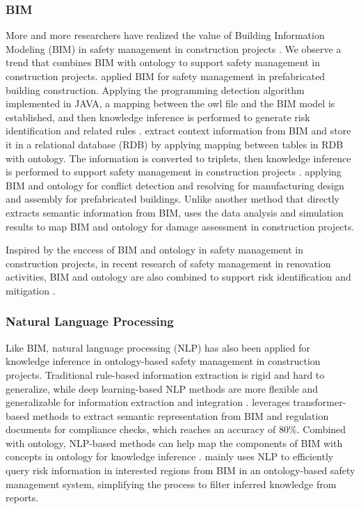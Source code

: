 \subsubsection*{BIM} 
More and more researchers have realized the value of Building Information Modeling (BIM) in safety management in construction projects \cite[]{ding2016construction}.
We observe a trend that combines BIM with ontology to support safety management in construction projects. 
\cite{shen2022bim} applied BIM for safety management in prefabricated building construction. Applying the programming detection algorithm implemented in JAVA, a mapping between 
the owl file and the BIM model is established, and then knowledge inference is performed to generate risk identification and related rules \cite[]{shen2022bim}. 
\cite{zhou2023bim} extract context information from BIM and store it in a relational database (RDB) by applying mapping between 
tables in RDB with ontology. The information is converted to triplets, then knowledge inference is performed to support safety management in construction projects \cite[]{zhou2023bim}.
\cite{qi2023bim} applying BIM and ontology for conflict detection and resolving for manufacturing design and assembly for prefabricated buildings. 
Unlike another method that directly extracts semantic information from BIM, \cite{xu2022ontology} uses the data analysis and simulation results to map BIM and ontology for damage assessment in construction projects.

Inspired by the success of BIM and ontology in safety management in construction projects, in recent research of safety management in renovation activities, BIM and ontology are also combined to support risk identification and mitigation \cite[]{doukari2024ontology}.

\subsubsection*{Natural Language Processing}
Like BIM, natural language processing (NLP) has also been applied for knowledge inference in ontology-based safety management in construction projects.
Traditional rule-based information extraction is rigid and hard to generalize, while deep learning-based NLP methods are more flexible and generalizable for information 
extraction and integration \cite[]{zhang2021semantic}. \cite{zhang2021semantic} leverages transformer-based methods to extract semantic representation from BIM and regulation documents for compliance checks, 
which reaches an accuracy of 80\%. Combined with ontology, NLP-based methods can help map the components of BIM with concepts in ontology for knowledge inference \cite[]{ding2016construction,zhou2021semantic}. 
\cite{shen2022bim} mainly uses NLP to efficiently query risk information in interested regions from BIM in an ontology-based safety management system, 
simplifying the process to filter inferred knowledge from reports.

